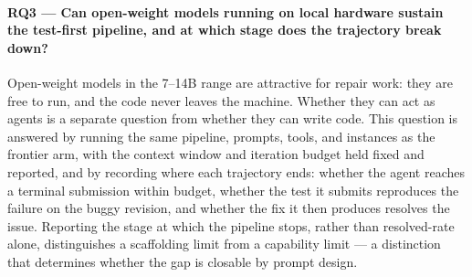 \paragraph{RQ3 --- Can open-weight models running on local hardware sustain the test-first pipeline, and at which stage does the trajectory break down?}
Open-weight models in the 7–14B range are attractive for repair work: they are free to run, and the code never leaves the machine. Whether they can act as agents is a separate question from whether they can write code. This question is answered by running the same pipeline, prompts, tools, and instances as the frontier arm, with the context window and iteration budget held fixed and reported, and by recording where each trajectory ends: whether the agent reaches a terminal submission within budget, whether the test it submits reproduces the failure on the buggy revision, and whether the fix it then produces resolves the issue. Reporting the stage at which the pipeline stops, rather than resolved-rate alone, distinguishes a scaffolding limit from a capability limit — a distinction that determines whether the gap is closable by prompt design. 


